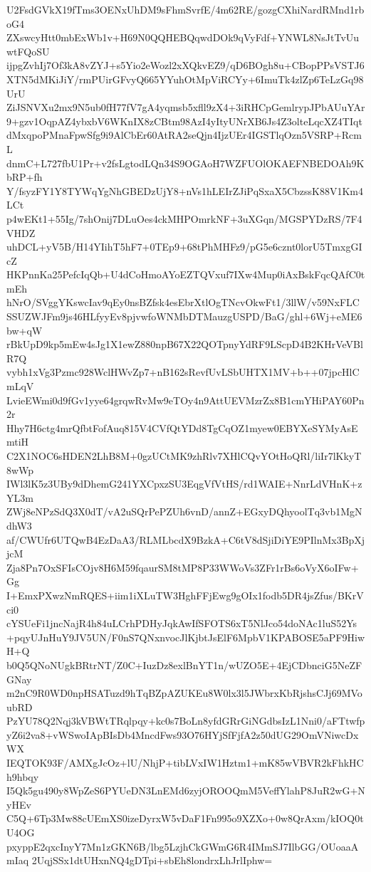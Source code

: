 U2FsdGVkX19fTms3OENxUhDM9sFhmSvrfE/4m62RE/gozgCXhiNardRMnd1rboG4
ZXswcyHtt0mbExWb1v+H69N0QQHEBQqwdDOk9qVyFdf+YNWL8NsJtTvUuwtFQoSU
ijpgZvhIj7Of3kA8vZYJ+s5Yio2eWozl2xXQkvEZ9/qD6BOgh8u+CBopPPsVSTJ6
XTN5dMKiJiY/rmPUirGFvyQ665YYuhOtMpViRCYy+6ImuTk4zlZp6TeLzGq98UrU
ZiJSNVXu2mx9N5ub0fH77fV7gA4yqmsb5xfll9zX4+3iRHCpGemlrypJPbAUuYAr
9+gzv1OqpAZ4ybxbV6WKnIX8zCBtm98AzI4yItyUNrXB6Js4Z3olteLqcXZ4TIqt
dMxqpoPMnaFpwSfg9i9AlCbEr60AtRA2seQjn4IjzUEr4IGSTlqOzn5VSRP+RcmL
dnmC+L727fbU1Pr+v2fsLgtodLQn34S9OGAoH7WZFUOlOKAEFNBEDOAh9KbRP+fh
Y/fsyzFY1Y8TYWqYgNhGBEDzUjY8+nVs1hLEIrZJiPqSxaX5CbzssK88V1Km4LCt
p4wEKt1+55Ig/7shOnij7DLuOes4ckMHPOmrkNF+3uXGqn/MGSPYDzRS/7F4VHDZ
uhDCL+yV5B/H14YIihT5hF7+0TEp9+68tPhMHFz9/pG5e6cznt0lorU5TmxgGIcZ
HKPnnKa25PefcIqQb+U4dCoHmoAYoEZTQVxuf7IXw4Mup0iAxBskFqcQAfC0tmEh
hNrO/SVggYKswcIav9qEy0nsBZfsk4esEbrXtlOgTNcvOkwFt1/3llW/v59NxFLC
SSUZWJFm9js46HLfyyEv8pjvwfoWNMbDTMauzgUSPD/BaG/ghl+6Wj+eME6bw+qW
rBkUpD9kp5mEw4sJg1X1ewZ880npB67X22QOTpnyYdRF9LScpD4B2KHrVeVBlR7Q
vybh1xVg3Pzmc928WclHWvZp7+nB162sRevfUvLSbUHTX1MV+b++07jpcHlCmLqV
LvieEWmi0d9fGv1yye64grqwRvMw9eTOy4n9AttUEVMzrZx8B1cmYHiPAY60Pn2r
Hhy7H6ctg4mrQfbtFofAuq815V4CVfQtYDd8TgCqOZ1myew0EBYXeSYMyAsEmtiH
C2X1NOC6sHDEN2LhB8M+0gzUCtMK9zhRlv7XHlCQvYOtHoQRl/liIr7lKkyT8wWp
IWl3lK5z3UBy9dDhemG241YXCpxzSU3EqgVfVtHS/rd1WAIE+NnrLdVHnK+zYL3m
ZWj8eNPzSdQ3X0dT/vA2uSQrPePZUh6vnD/annZ+EGxyDQhyoolTq3vb1MgNdhW3
af/CWUfr6UTQwB4EzDaA3/RLMLbcdX9BzkA+C6tV8dSjiDiYE9PIlnMx3BpXjjcM
Zja8Pn7OxSFIsCOjv8H6M59fqaurSM8tMP8P33WWoVs3ZFr1rBs6oVyX6oIFw+Gg
I+EmxPXwzNmRQES+iim1iXLuTW3HghFFjEwg9gOIx1fodb5DR4jsZfus/BKrVci0
cYSUeFi1jncNajR4h84uLCrhPDHyJqkAwIfSFOTS6xT5NlJco54doNAc1luS52Ys
+pqyUJnHuY9JV5UN/F0nS7QNxnvocJlKjbtJsElF6MpbV1KPABOSE5aPF9HiwH+Q
b0Q5QNoNUgkBRtrNT/Z0C+IuzDz8exlBnYT1n/wUZO5E+4EjCDbnciG5NeZFGNay
m2nC9R0WD0npHSATuzd9hTqBZpAZUKEu8W0lx3l5JWbrxKbRjshsCJj69MVoubRD
PzYU78Q2Nqj3kVBWtTRqlpqy+kc0s7BoLn8yfdGRrGiNGdbsIzL1Nni0/aFTtwfp
yZ6i2va8+vWSwoIApBIsDb4MncdFws93O76HYjSfFjfA2z50dUG29OmVNiwcDxWX
IEQTOK93F/AMXgJcOz+lU/NhjP+tibLVxIW1Hztm1+mK85wVBVR2kFhkHCh9hbqy
I5Qk5gu490y8WpZeS6PYUeDN3LnEMd6zyjOROOQmM5VeffYlahP8JuR2wG+NyHEv
C5Q+6Tp3Mw88cUEmXS0izeDyrxW5vDaF1Fn995o9XZXo+0w8QrAxm/kIOQ0tU4OG
pxyppE2qxcInyY7Mn1zGKN6B/lbg5LzjhCkGWmG6R4IMmSJ7IlbGG/OUoaaAmIaq
2UqjSSx1dtUHxnNQ4gDTpi+sbEh8londrxLhJrlIphw=
